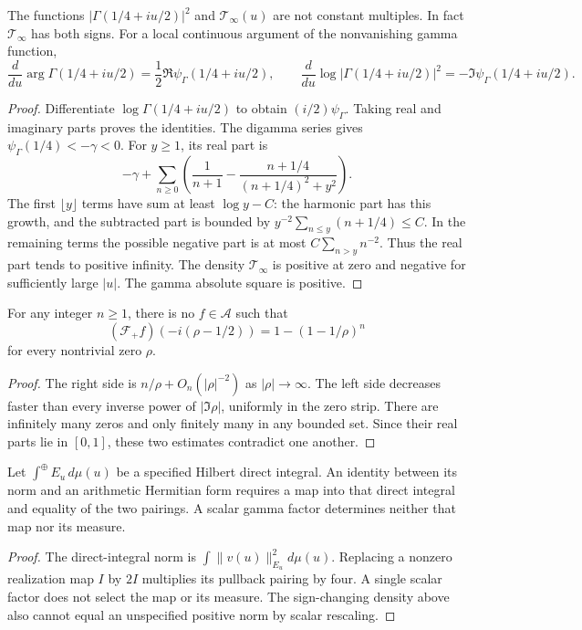 \begin{proposition}
\label{v4-arith:w5-a:prop:archimedean-not-absorbed}
The functions $|\Gamma(1/4+iu/2)|^2$ and $\mathcal T_\infty(u)$
are not constant multiples. In fact $\mathcal T_\infty$ has both signs.
For a local continuous argument of the nonvanishing gamma function,
\[
 \frac{d}{du}\arg\Gamma(1/4+iu/2)=\frac12\Re\psi_\Gamma(1/4+iu/2),
 \qquad
 \frac{d}{du}\log|\Gamma(1/4+iu/2)|^2=-\Im\psi_\Gamma(1/4+iu/2).
\]
\end{proposition}
\begin{proof}
Differentiate $\log\Gamma(1/4+iu/2)$ to obtain $(i/2)\psi_\Gamma$.
Taking real and imaginary parts proves the identities.
The digamma series gives $\psi_\Gamma(1/4)<-\gamma<0$.
For $y\ge1$, its real part is
\[
 -\gamma+\sum_{n\ge0}
 \left(\frac1{n+1}-\frac{n+1/4}{(n+1/4)^2+y^2}\right).
\]
The first $\lfloor y\rfloor$ terms have sum at least $\log y-C$:
the harmonic part has this growth, and the subtracted part is bounded
by $y^{-2}\sum_{n\le y}(n+1/4)\le C$.
In the remaining terms the possible negative part is at most
$C\sum_{n>y}n^{-2}$. Thus the real part tends to positive infinity.
The density $\mathcal T_\infty$ is positive at zero and negative
for sufficiently large $|u|$. The gamma absolute square is positive.
\end{proof}

\begin{proposition}
\label{v4-arith:w5-a:prop:li-via-weil}
For any integer $n\ge1$, there is no $f\in\mathscr A$ such that
\[
 (\mathcal F_+f)(-i(\rho-1/2))=1-(1-1/\rho)^n
\]
for every nontrivial zero $\rho$.
\end{proposition}
\begin{proof}
The right side is $n/\rho+O_n(|\rho|^{-2})$ as $|\rho|\to\infty$.
The left side decreases faster than every inverse power of
$|\Im\rho|$, uniformly in the zero strip. There are infinitely many
zeros and only finitely many in any bounded set. Since their real
parts lie in $[0,1]$, these two estimates contradict one another.
\end{proof}

\begin{proposition}
\label{v4-arith:w5-a:prop:eisenstein-residual}
Let $\int^\oplus E_u\,d\mu(u)$ be a specified Hilbert direct integral.
An identity between its norm and an arithmetic Hermitian form requires
a map into that direct integral and equality of the two pairings.
A scalar gamma factor determines neither that map nor its measure.
\end{proposition}
\begin{proof}
The direct-integral norm is $\int\|v(u)\|_{E_u}^2d\mu(u)$.
Replacing a nonzero realization map $I$ by $2I$ multiplies its
pullback pairing by four. A single scalar factor does not select
the map or its measure. The sign-changing density above also
cannot equal an unspecified positive norm by scalar rescaling.
\end{proof}

